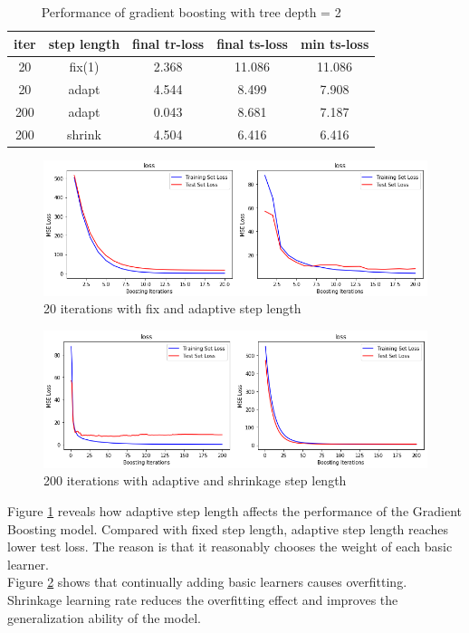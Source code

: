\documentclass[10pt,twocolumn,letterpaper]{article}
\begin{document}
\begin{table}[ht]
\centering
\caption{Performance of gradient boosting with tree depth = 2}
 \begin{tabular}{||c c c c c||} 
 \hline
iter & step length & final tr-loss & final ts-loss & min ts-loss \\ 
 \hline\hline
20   & fix(1) & 2.368 & 11.086 & 11.086  \\ 
 \hline\hline
20   & adapt & 4.544 & 8.499 & 7.908 \\ 
\hline\hline
200  & adapt & 0.043 & 8.681 & 7.187 \\ 
\hline\hline
200  & shrink & 4.504 & 6.416 & 6.416\\ 
 \hline\hline
\end{tabular}
\label{table:d2gbloss}
\end{table}

\begin{figure}[h!]
  \includegraphics[width=\linewidth]{fixsl20.png}
  \caption{20 iterations with fix and adaptive step length}
  \label{fig:gb1}
\end{figure}
\begin{figure}[h!]
  \includegraphics[width=\linewidth]{adaptsl200.png}
  \caption{200 iterations with adaptive and shrinkage step length}
  \label{fig:gb2}
\end{figure}
Figure \ref{fig:gb1} reveals how adaptive step length affects the performance of the Gradient Boosting model. Compared with fixed step length, adaptive step length reaches lower test loss. The reason is that it reasonably chooses the weight of each basic learner.\\
Figure \ref{fig:gb2} shows that continually adding basic learners causes overfitting. Shrinkage learning rate reduces the overfitting effect and improves the generalization ability of the model.\\
\end{document}
